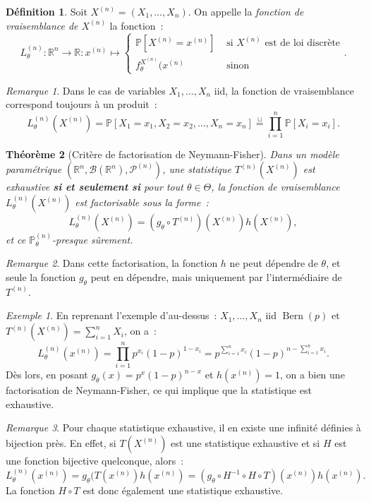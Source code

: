 \documentclass{report}
\DeclareMathOperator{\Bern}{Bern}  %
\renewcommand{\P}{\mathbb P}
\newcommand{\statmod}[4]{\left(#1^{#4}, #2\left(#1^{#4}\right), #3^{\left(#4\right)}\right)}
\newcommand{\R}{\mathbb R}
\newcommand{\Brl}{\mathcal B}  %
\newcommand{\n}{{(n)}}
\newtheorem{thm}{Théorème}[chapter]
\theoremstyle{definition}
\newtheorem{déf}[thm]{Définition}
\theoremstyle{remark}
\newtheorem*{rmq}{Remarque}
\newtheorem{ex}{Exemple}[chapter]
\begin{document}
		\begin{déf} Soit $X^{(n)} = (X_1, \ldots, X_n)$. On appelle la \textit{fonction de vraisemblance de $X^{(n)}$} la fonction~:
		\[L_\theta^{(n)} : \R^n \to \R : x^{(n)} \mapsto \begin{cases}\P[X^{(n)}
			= x^{(n)}] &\text{ si $X^{(n)}$ est de loi discrète} \\f_\theta^{X^{(n)}}(x^{(n)} &\text{ sinon}\end{cases}.\]
		\end{déf}

		\begin{rmq} Dans le cas de variables $X_1, \ldots, X_n$ iid, la fonction de vraisemblance correspond toujours à un produit~:
		\[L_\theta^{(n)}(X^{(n)}) = \P[X_1 = x_1, X_2 = x_2, \ldots, X_n = x_n] \overset \sqcup= \prod_{i=1}^n\P[X_i = x_i].\]
		\end{rmq}

		\begin{thm}[Critère de factorisation de Neymann-Fisher] Dans un modèle paramétrique $\statmod \R\Brl{\mathcal P}n$, une statistique $T^{(n)}(X^{(n)})$ est
		exhaustive \textbf{si et seulement si} pour tout $\theta \in \Theta$, la fonction de vraisemblance $L_\theta^{(n)}(X^{(n)})$ est factorisable sous la forme~:
		\[L_\theta^{(n)}(X^{(n)}) = \left(g_\theta \circ T^{(n)}\right)(X^\n) h(X^\n),\]
		et ce $\P_\theta^{(n)}$-presque sûrement.
		\end{thm}

		\begin{rmq} Dans cette factorisation, la fonction $h$ ne peut dépendre de $\theta$, et seule la fonction $g_\theta$ peut en dépendre, mais uniquement par
		l'intermédiaire de $T^{(n)}$.
		\end{rmq}

		\begin{ex} En reprenant l'exemple d'au-dessus~: $X_1, \ldots, X_n$ iid $\Bern(p)$ et $T^{(n)}(X^{(n)}) = \sum_{i=1}^nX_i$, on a~:
		\[L_\theta^{(n)}(x^{(n)}) = \prod_{i=1}^np^{x_i}(1-p)^{1-x_i} = p^{\sum_{i=1}^nx_i}(1-p)^{n - \sum_{i=1}^nx_i}.\]
		Dès lors, en posant $g_\theta(x) = p^x(1-p)^{n-x}$ et $h(x^{(n)}) = 1$, on a bien une factorisation de Neymann-Fisher, ce qui implique que la statistique
		est exhaustive.
		\end{ex}

		\begin{rmq} Pour chaque statistique exhaustive, il en existe une infinité définies à bijection près. En effet, si $T(X^{(n)})$ est une statistique exhaustive
		et si $H$ est une fonction bijective quelconque, alors~:
		\[L_\theta^{(n)}(x^{(n)}) = g_\theta(T(x^{(n)})h(x^{(n)}) = (g_\theta \circ H^{-1} \circ H \circ T)(x^{(n)})h(x^{(n)}).\]
		La fonction $H \circ T$ est donc également une statistique exhaustive.
		\end{rmq}
\end{document}
